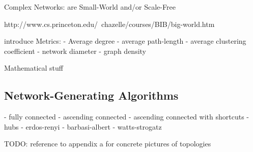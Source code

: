 \documentclass[../Bachelorarbeit.tex]{subfiles}
\begin{document}
Complex Networks: are Small-World and/or Scale-Free \citep{BarratWeigt_PropertiesSmallWorld} \citep{AmaralScalaStanley_ClassesSmallWorld}

\citep {Kleinfeld_BigWorld}
http://www.cs.princeton.edu/~chazelle/courses/BIB/big-world.htm

introduce Metrics:
- Average degree
- average path-length
- average clustering coefficient
- network diameter
- graph density

Mathematical stuff 
\citep{Newman_Eigenvectors}
\citep{AielloChungLu_RandomEvolution}
\citep{EbelMielschBornholdt_TopologyEmail}
\citep{GaertlerPatrignani_AutonomousSystem}

\subsection{Network-Generating Algorithms}
- fully connected
- ascending connected
- ascending connected with shortcuts
- hubs
- erdos-renyi
- barbasi-albert
- watts-strogatz

TODO: reference to appendix a for concrete pictures of topologies
\end{document}
